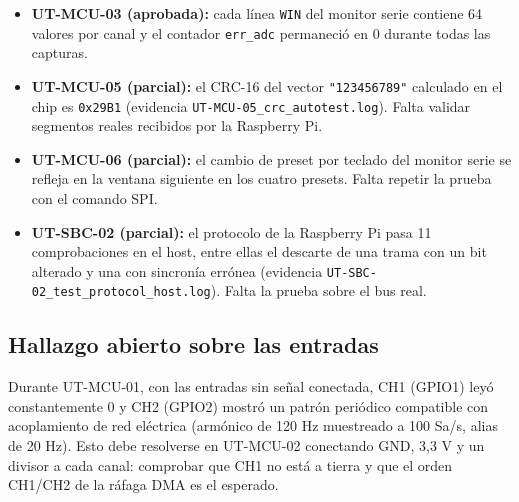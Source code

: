 \documentclass[12pt,a4paper]{article}
\begin{document}
\begin{itemize}
  \item \textbf{UT-MCU-03 (aprobada):} cada línea \texttt{WIN} del monitor serie contiene 64 valores por canal y el contador \texttt{err\_adc} permaneció en 0 durante todas las capturas.
  \item \textbf{UT-MCU-05 (parcial):} el CRC-16 del vector \texttt{"123456789"} calculado en el chip es \texttt{0x29B1} (evidencia \texttt{UT-MCU-05\_crc\_autotest.log}). Falta validar segmentos reales recibidos por la Raspberry Pi.
  \item \textbf{UT-MCU-06 (parcial):} el cambio de preset por teclado del monitor serie se refleja en la ventana siguiente en los cuatro presets. Falta repetir la prueba con el comando SPI.
  \item \textbf{UT-SBC-02 (parcial):} el protocolo de la Raspberry Pi pasa 11 comprobaciones en el host, entre ellas el descarte de una trama con un bit alterado y una con sincronía errónea (evidencia \texttt{UT-SBC-02\_test\_protocol\_host.log}). Falta la prueba sobre el bus real.
\end{itemize}

\subsection{Hallazgo abierto sobre las entradas}

Durante UT-MCU-01, con las entradas sin señal conectada, CH1 (GPIO1) leyó constantemente 0 y CH2 (GPIO2) mostró un patrón periódico compatible con acoplamiento de red eléctrica (armónico de 120 Hz muestreado a 100 Sa/s, alias de 20 Hz). Esto debe resolverse en UT-MCU-02 conectando GND, 3{,}3 V y un divisor a cada canal: comprobar que CH1 no está a tierra y que el orden CH1/CH2 de la ráfaga DMA es el esperado.
\end{document}
